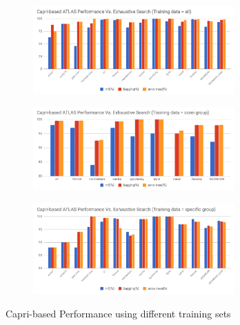   \begin{figure}[tbhp]
    \centering
    \begin{subfigure}[b]{1.0\linewidth}
      \centering
      \includegraphics[width=0.85\textwidth]{images/all_perf.png}
      \caption{ }
      \label{fig:all_perf}
    \end{subfigure}
    \begin{subfigure}[b]{1.0\linewidth}
      \centering
      \includegraphics[width=0.85\textwidth]{images/corei_perf.png}
      \caption{ }
      \label{fig:corei_perf}
    \end{subfigure}
    \begin{subfigure}[b]{1.0\linewidth}
      \centering
      \includegraphics[width=0.85\textwidth]{images/specific_perf.png}
      \caption{ }
      \label{fig:specific_perf}
    \end{subfigure}
  \caption{Capri-based \atl Performance using different training sets}
  \end{figure}

